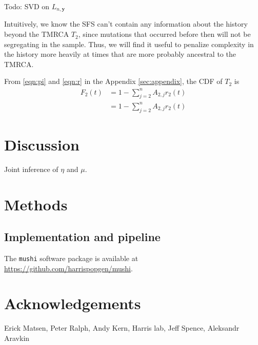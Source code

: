 \documentclass[11pt]{article}
\begin{document}
Todo: SVD on $L_{n, \boldsymbol y}$

Intuitively, we know the SFS can't contain any information about the history beyond the TMRCA $T_2$, since mutations that occurred before then will not be segregating in the sample.
Thus, we will find it useful to penalize complexity in the history more heavily at times that are more probably ancestral to the TMRCA.

From \eqref{eqn:pi} and \eqref{eqn:r} in the Appendix \ref{sec:appendix}, the CDF of $T_2$ is
\begin{align}
F_2(t) &= 1 - \sum_{j=2}^n A_{2,j}r_2(t)\\
&= 1 - \sum_{j=2}^n A_{2,j}r_2(t)
\end{align}


\section*{Discussion}\label{sec:discussion}

Joint inference of $\eta$ and $\mu$.


\section*{Methods}\label{sec:methods}

\subsection*{Implementation and pipeline}\label{sec:methods:tool}

The \texttt{mushi} software package is available at \url{https://github.com/harrispopgen/mushi}.

\section*{Acknowledgements}\label{sec:ack}

Erick Matsen, Peter Ralph, Andy Kern, Harris lab, Jeff Spence, Aleksandr Aravkin





\appendix

\end{document}

